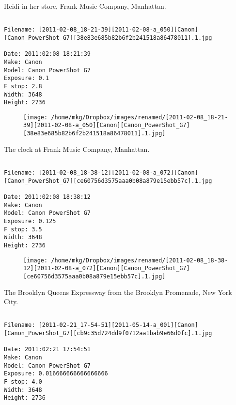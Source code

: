 \clearpage
\onecolumn
\noindent Heidi in her store, Frank Music Company, Manhattan.
\noindent
\begin{lstlisting}

Filename: [2011-02-08_18-21-39][2011-02-08-a_050][Canon][Canon_PowerShot_G7][38e83e685b82b6f2b241518a86478011].1.jpg

Date: 2011:02:08 18:21:39
Make: Canon
Model: Canon PowerShot G7
Exposure: 0.1
F stop: 2.8
Width: 3648
Height: 2736
\end{lstlisting}
\clearpage

\begin{figure}
\texttt{[image: /home/mkg/Dropbox/images/renamed/[2011-02-08\_18-21-39][2011-02-08-a\_050][Canon][Canon\_PowerShot\_G7][38e83e685b82b6f2b241518a86478011].1.jpg]}
\end{figure}
    
\clearpage
\onecolumn
\noindent The clock at Frank Music Company, Manhattan.
\noindent
\begin{lstlisting}

Filename: [2011-02-08_18-38-12][2011-02-08-a_072][Canon][Canon_PowerShot_G7][ce60756d3575aaa0b08a879e15ebb57c].1.jpg

Date: 2011:02:08 18:38:12
Make: Canon
Model: Canon PowerShot G7
Exposure: 0.125
F stop: 3.5
Width: 3648
Height: 2736
\end{lstlisting}
\clearpage

\begin{figure}
\texttt{[image: /home/mkg/Dropbox/images/renamed/[2011-02-08\_18-38-12][2011-02-08-a\_072][Canon][Canon\_PowerShot\_G7][ce60756d3575aaa0b08a879e15ebb57c].1.jpg]}
\end{figure}
    
\clearpage
\onecolumn
\noindent The Brooklyn Queens Expressway from the Brooklyn Promenade, New York City.
\noindent
\begin{lstlisting}

Filename: [2011-02-21_17-54-51][2011-05-14-a_001][Canon][Canon_PowerShot_G7][cb9c35d724dd9f0712aa1bab9e66d0fc].1.jpg

Date: 2011:02:21 17:54:51
Make: Canon
Model: Canon PowerShot G7
Exposure: 0.016666666666666666
F stop: 4.0
Width: 3648
Height: 2736
\end{lstlisting}
\clearpage

